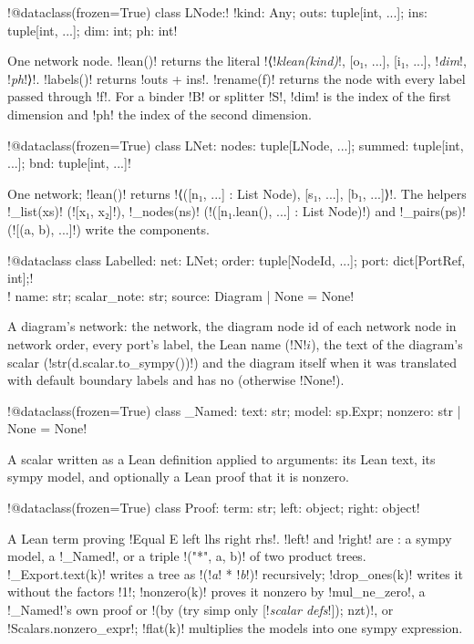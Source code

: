 {\begin{signature}
\py!@dataclass(frozen=True) class LNode:!
\py!kind: Any; outs: tuple[int, ...]; ins: tuple[int, ...]; dim: int; ph: int!
\end{signature}
\noindent One network node. \py!lean()! returns the literal
\code!⟨!\textit{klean(kind)}\code!, [o₁, ...], [i₁, ...], !\textit{dim}\code!, !\textit{ph}\code!⟩!.
\py!labels()! returns \py!outs + ins!. \py!rename(f)! returns the node with every label passed
through \py!f!. For a binder \code!B! or splitter \code!S!, \py!dim! is the index of the first
dimension and \py!ph! the index of the second dimension.

\begin{signature}
\py!@dataclass(frozen=True) class LNet: nodes: tuple[LNode, ...]; summed: tuple[int, ...]; bnd: tuple[int, ...]!
\end{signature}
\noindent One network; \py!lean()! returns \code!⟨([n₁, ...] : List Node), [s₁, ...], [b₁, ...]⟩!.
The helpers \py!_list(xs)! (\code![x₁, x₂]!), \py!_nodes(ns)!
(\code!([n₁.lean(), ...] : List Node)!) and \py!_pairs(ps)! (\code![(a, b), ...]!) write the
components.

\begin{signature}
\py!@dataclass class Labelled: net: LNet; order: tuple[NodeId, ...]; port: dict[PortRef, int];!\\
\py!  name: str; scalar_note: str; source: Diagram | None = None!
\end{signature}
\noindent A diagram's network: the network, the diagram node id of each network node in
network order, every port's label, the Lean name (\code!N!$i$), the text of the diagram's scalar
(\py!str(d.scalar.to_sympy())!) and the diagram itself when it was translated with default
boundary labels and has no \bboxes{} (otherwise \py!None!).

\begin{signature}
\py!@dataclass(frozen=True) class _Named: text: str; model: sp.Expr; nonzero: str | None = None!
\end{signature}
\noindent A scalar written as a Lean definition applied to arguments: its Lean text, its sympy
model, and optionally a Lean proof that it is nonzero.

\begin{signature}
\py!@dataclass(frozen=True) class Proof: term: str; left: object; right: object!
\end{signature}
\noindent A Lean term proving \lean!Equal E left lhs right rhs!. \py!left! and \py!right! are
: a sympy model, a \py!_Named!, or a triple \py!("*", a, b)! of two product
trees. \py!_Export.text(k)! writes a tree as \code!(!\textit{a}\code! * !\textit{b}\code!)!
recursively; \py!drop_ones(k)! writes it without the factors \code!1!; \py!nonzero(k)! proves it
nonzero by \lean!mul_ne_zero!, a \py!_Named!'s own proof or
\code!(by (try simp only [!\textit{scalar defs}\code!]); nzt)!, or \py!Scalars.nonzero_expr!;
\py!flat(k)! multiplies the models into one sympy expression.

}
